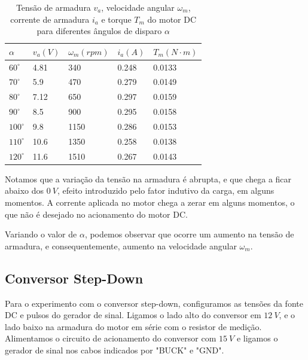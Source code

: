 \documentclass{article}
\begin{document}
\begin{table}[H]
	\centering
	\caption{Tensão de armadura $v_a$, velocidade angular $\omega_m$, corrente de armadura $i_a$ e torque $T_m$ do motor DC para diferentes ângulos de disparo $\alpha$}
	\label{tab:varet}
	\begin{tabular}{|l|l|l|l|l|}
		\hline
		$\alpha$    & $v_a (V)$ & $\omega_m (rpm)$ & $i_a  (A)$ & $T_m (N\cdot m)$ \\ \hline
		$60^\circ$  & 4.81      & 340              & 0.248         & 0.0133           \\ \hline
		$70^\circ$  & 5.9       & 470              & 0.279         & 0.0149           \\ \hline
		$80^\circ$  & 7.12      & 650              & 0.297         & 0.0159           \\ \hline
		$90^\circ$  & 8.5       & 900              & 0.295     & 0.0158     \\ \hline
		$100^\circ$ & 9.8       & 1150             & 0.286         & 0.0153           \\ \hline
		$110^\circ$ & 10.6      & 1350             & 0.258         & 0.0138           \\ \hline
		$120^\circ$ & 11.6      & 1510             & 0.267         & 0.0143           \\ \hline
	\end{tabular}
\end{table}

Notamos que a variação da tensão na armadura é abrupta, e que chega a ficar abaixo dos $0\ V$, efeito introduzido pelo fator indutivo da carga, em alguns momentos. A corrente aplicada no motor chega a zerar em alguns momentos, o que não é desejado no acionamento do motor DC.

Variando o valor de $\alpha$, podemos observar que ocorre um aumento na tensão de armadura, e consequentemente, aumento na velocidade angular $\omega_m$. 


\subsection{Conversor Step-Down}
Para o experimento com o conversor step-down, configuramos as tensões da fonte DC e pulsos do gerador de sinal. Ligamos o lado alto do conversor em $12\ V$, e o lado baixo na armadura do motor em série com o resistor de medição. Alimentamos o circuito de acionamento do conversor com $15\ V$ e ligamos o gerador de sinal nos cabos indicados por "BUCK" e "GND".
\end{document}
